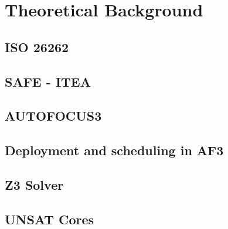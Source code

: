\chapter{Theoretical Background}\label{chapter:theoretical_background}

\section{ISO 26262}

\section{SAFE - ITEA}

\section{AUTOFOCUS3}

\section{Deployment and scheduling in AF3}

\section{Z3 Solver}

\section{UNSAT Cores}

